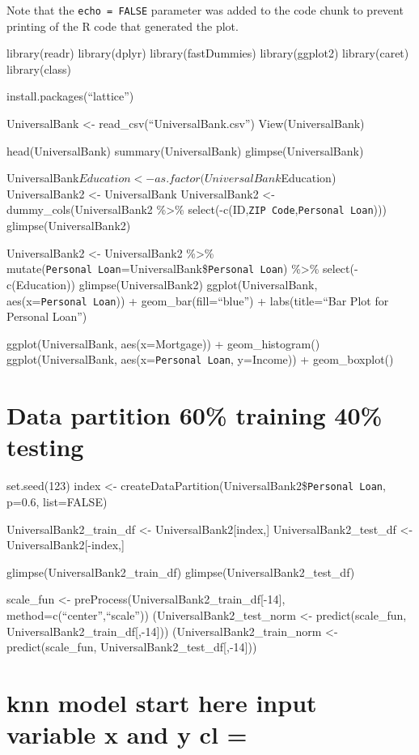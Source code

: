 \documentclass[
]{article}
\begin{document}
Note that the \texttt{echo\ =\ FALSE} parameter was added to the code
chunk to prevent printing of the R code that generated the plot.

library(readr) library(dplyr) library(fastDummies) library(ggplot2)
library(caret) library(class)

install.packages(``lattice'')

UniversalBank \textless- read\_csv(``UniversalBank.csv'')
View(UniversalBank)

head(UniversalBank) summary(UniversalBank) glimpse(UniversalBank)

UniversalBank\(Education <- as.factor(UniversalBank\)Education)
UniversalBank2 \textless- UniversalBank UniversalBank2 \textless-
dummy\_cols(UniversalBank2 \%\textgreater\%
select(-c(ID,\texttt{ZIP\ Code},\texttt{Personal\ Loan})))
glimpse(UniversalBank2)

UniversalBank2 \textless- UniversalBank2 \%\textgreater\%
mutate(\texttt{Personal\ Loan}=UniversalBank\$\texttt{Personal\ Loan})
\%\textgreater\% select(-c(Education)) glimpse(UniversalBank2)
ggplot(UniversalBank, aes(x=\texttt{Personal\ Loan})) +
geom\_bar(fill=``blue'') + labs(title=``Bar Plot for Personal Loan'')

ggplot(UniversalBank, aes(x=Mortgage)) + geom\_histogram()
ggplot(UniversalBank, aes(x=\texttt{Personal\ Loan}, y=Income)) +
geom\_boxplot()

\hypertarget{data-partition-60-training-40-testing}{%
\section{Data partition 60\% training 40\%
testing}\label{data-partition-60-training-40-testing}}

set.seed(123) index \textless-
createDataPartition(UniversalBank2\$\texttt{Personal\ Loan}, p=0.6,
list=FALSE)

UniversalBank2\_train\_df \textless- UniversalBank2{[}index,{]}
UniversalBank2\_test\_df \textless- UniversalBank2{[}-index,{]}

glimpse(UniversalBank2\_train\_df) glimpse(UniversalBank2\_test\_df)

scale\_fun \textless- preProcess(UniversalBank2\_train\_df{[}-14{]},
method=c(``center'',``scale'')) (UniversalBank2\_test\_norm \textless-
predict(scale\_fun, UniversalBank2\_train\_df{[},-14{]}))
(UniversalBank2\_train\_norm \textless- predict(scale\_fun,
UniversalBank2\_test\_df{[},-14{]}))

\hypertarget{knn-model-start-here-input-variable-x-and-y-cl}{%
\section{knn model start here input variable x and y cl
=}\label{knn-model-start-here-input-variable-x-and-y-cl}}
\end{document}
